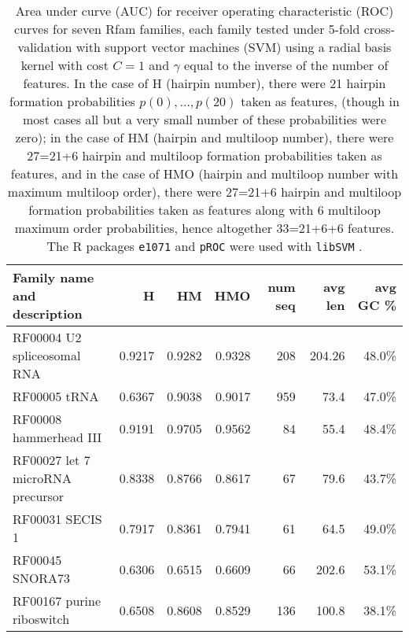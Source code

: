 \begin{table*}
\begin{tabular}{|l|rrrrrr|}
\hline
Family name and description & H & HM & HMO & num seq& avg len & avg GC \% \\
\hline
RF00004 U2 spliceosomal RNA & 0.9217  & 0.9282  & 0.9328  & 208 & 204.26 &48.0\% \\
RF00005 tRNA &  0.6367  & 0.9038  & 0.9017  & 959 & 73.4& 47.0\%\\
RF00008 hammerhead III &  0.9191  & 0.9705  & 0.9562  & 84 & 55.4 & 48.4\% \\
RF00027 let 7 microRNA precursor &  0.8338  & 0.8766  & 0.8617  & 67 & 79.6 & 43.7\% \\
RF00031 SECIS 1 & 0.7917  & 0.8361  & 0.7941  & 61 & 64.5 & 49.0\% \\
RF00045 SNORA73 & 0.6306  & 0.6515  & 0.6609  & 66 & 202.6 & 53.1\% \\
RF00167 purine riboswitch & 0.6508  & 0.8608  & 0.8529  & 136 & 100.8 & 38.1\% \\
\hline
\end{tabular}
\caption{Area under curve (AUC) for receiver operating characteristic
(ROC) curves for
seven Rfam families, each family tested under 5-fold cross-validation with
support vector machines (SVM) using a radial basis kernel with
cost $C=1$ and $\gamma$ equal to the inverse of the number of features.
In the case of H (hairpin number), there were 21 hairpin formation
probabilities $p(0),\ldots,p(20)$ taken as features,
(though in
most cases all but a very small number of these probabilities were zero);
in the case  of HM (hairpin and multiloop number), there were
27=21+6 hairpin and multiloop formation probabilities taken as
features, and in the case  of HMO
(hairpin and multiloop number with maximum multiloop order), there were
27=21+6 hairpin and multiloop formation probabilities taken as features
along with 6 multiloop maximum order probabilities, hence altogether
33=21+6+6 features.
The R packages {\tt e1071} \citep{RpackageForSVM} and {\tt pROC} \citep{pROC}
were used with {\tt libSVM} \citep{libSVM}.
}
\label{table:AUC}
\end{table*}

